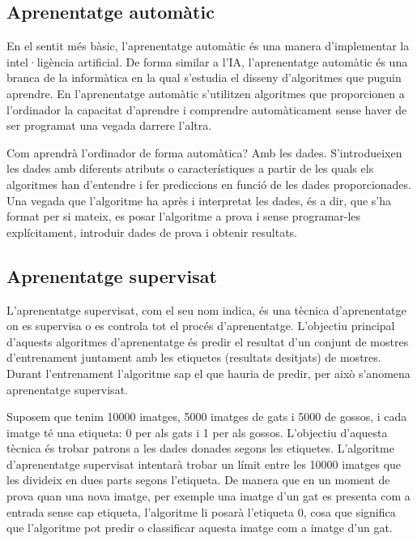 \begin{refsection}

	\chapter{Aprenentatge automàtic}
	\label{chap:ML}
	
	En el sentit més bàsic, l'aprenentatge automàtic és una manera d'implementar la intel·ligència artificial. De forma similar a l'IA, l’aprenentatge automàtic és una branca de la informàtica en la qual s'estudia el disseny d'algoritmes que puguin aprendre. En l'aprenentatge automàtic s'utilitzen algoritmes que proporcionen a l'ordinador la capacitat d'aprendre i comprendre automàticament sense haver de ser programat una vegada darrere l'altra.
	
	Com aprendrà l'ordinador de forma automàtica? Amb les dades. S'introdueixen les dades amb diferents atributs o característiques a partir de les quals els algoritmes han d'entendre i fer prediccions en funció de les dades proporcionades. Una vegada que l'algoritme ha après i interpretat les dades, és a dir, que s’ha format per si mateix, es posar l'algoritme a prova i sense programar-les explícitament, introduir dades de prova i obtenir resultats.

	\section{Aprenentatge supervisat}
	
	L'aprenentatge supervisat, com el seu nom indica, és una tècnica d'aprenentatge on es supervisa o es controla tot el procés d’aprenentatge. L'objectiu principal d'aquests algoritmes d'aprenentatge és predir el resultat d'un conjunt de mostres d'entrenament juntament amb les etiquetes (resultats desitjats) de mostres. Durant l'entrenament l'algoritme sap el que hauria de predir, per això s'anomena aprenentatge supervisat.\supercite{DataCamp}
	
	Suposem que tenim 10000 imatges, 5000 imatges de gats i 5000 de gossos, i cada imatge té una etiqueta: 0 per als gats i 1 per als gossos. L'objectiu d'aquesta tècnica és trobar patrons a les dades donades segons les etiquetes. L’algoritme d’aprenentatge supervisat intentarà trobar un límit entre les 10000 imatges que les divideix en dues parts segons l'etiqueta. De manera que en un moment de prova quan una nova imatge, per exemple una imatge d'un gat es presenta com a entrada sense cap etiqueta, l'algoritme li posarà l'etiqueta 0, cosa que significa que l'algoritme pot predir o classificar aquesta imatge com a imatge d'un gat.\supercite{edureka}
	

\end{refsection}

